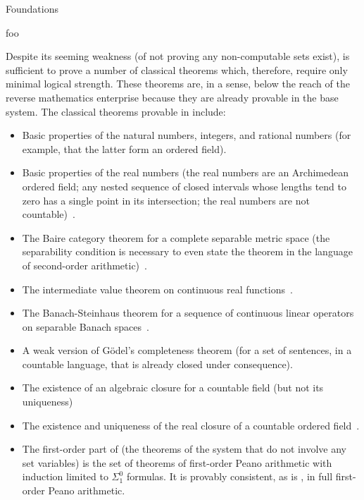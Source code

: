\documentclass[12pt]{PalisadesLakesBook}
\begin{document}
\begin{plSection}{Foundations}
\begin{plSection}{}
  \begin{plQuote}
  {}%
  {foo}%
  {%
    Despite its seeming weakness (of not proving any non-computable sets exist), 
     is sufficient to prove a number of classical theorems which, therefore, 
    require only minimal logical strength. 
    These theorems are, in a sense, below the reach of the reverse mathematics enterprise 
    because they are already provable in the base system. 
    The classical theorems provable in  include:
  \begin{itemize}
    \item Basic properties of the natural numbers, integers, and rational numbers (for example,
    that the latter form an ordered field).
    \item Basic properties of the real numbers (the real numbers are an Archimedean ordered field;
    any nested sequence of closed intervals whose lengths tend to zero has a single point in its intersection;
    the real numbers are not countable)~\cite[Section II.4]{Simpson:2009:Subsystems}.
    \item The Baire category theorem for a complete separable metric space
    (the separability condition is necessary to even state the theorem in the language of second-order
    arithmetic)~\cite[Theorem II.5.8]{Simpson:2009:Subsystems}.
    \item The intermediate value theorem on continuous real
    functions~\cite[Theorem II.6.6]{Simpson:2009:Subsystems}.
    \item The Banach-Steinhaus theorem for a sequence of continuous linear operators
    on separable Banach spaces~\cite[theorem II.10.8]{Simpson:2009:Subsystems}.
    \item A weak version of G\"{o}del's completeness theorem (for a set of sentences, in a countable language,
    that is already closed under consequence).
    \item The existence of an algebraic closure for a countable field
    (but not its uniqueness)~\cite[Sections II.9.4--II.9.8]{Simpson:2009:Subsystems}
    \item The existence and uniqueness of the real closure
    of a countable ordered field~\cite[Sections II.9.5, II.9.7]{Simpson:2009:Subsystems}.
    \item The first-order part of  (the theorems of the system that do not involve any set variables)
    is the set of theorems of first-order Peano arithmetic with induction limited to $\Sigma^{0}_{1}$ formulas.
    It is provably consistent, as is , in full first-order Peano arithmetic.
  \end{itemize}
  }
  \end{plQuote}


\end{plSection}
\end{plSection}
\end{document}
